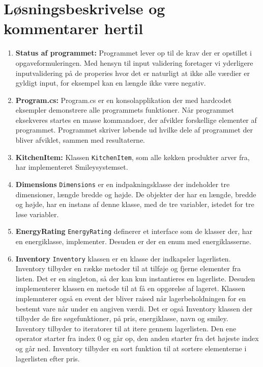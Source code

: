 \documentclass[11pt]{article}
\newcommand{\mono}{\texttt}
\begin{document}
\section{Løsningsbeskrivelse og kommentarer hertil}
\begin{enumerate}
	\item[] \textbf{Status af programmet:}
	Programmet lever op til de krav der er opstillet i opgaveformuleringen. Med hensyn til input validering foretager vi yderligere inputvalidering på de properies hvor det er naturligt at ikke alle værdier er gyldigt input, for eksempel kan en længde ikke være negativ. 
	\item[] \textbf{Program.cs:}
	Program.cs er en konsolapplikation der med hardcodet eksempler demonstrere alle programmets funktioner. Når programmet eksekveres startes en masse kommandoer, der afvikler forskellige elementer af programmet. Programmet skriver løbende ud hvilke dele af programmet der bliver afviklet, sammen med resultaterne. 
			
	\item[] \textbf{KitchenItem:} Klassen \mono{KitchenItem}, som alle køkken produkter arver fra, har implementeret Smileysystemset.
		
	\item[] \textbf{Dimensions} \mono{Dimensions} er en indpakningsklasse der indeholder tre dimensioner, længde bredde og højde. De objekter der har en længde, bredde og højde, har en instans af denne klasse, med de tre variabler, istedet for tre løse variabler.  
	
	\item[] \textbf{EnergyRating} \mono{EnergyRating} definerer et interface som de klasser der, har en energiklasse, implementer. Desuden er der en enum med energiklasserne. 	
	
	\item[] \textbf{Inventory} \mono{Inventory} klassen er en klasse der indkapsler lagerlisten. Inventory tilbyder en række metoder til at tilføje og fjerne elementer fra listen. Det er en singleton, så der kan kun instantieres en lagerliste. Desuden implementerer klassen en metode til at få en opgørelse af lageret. Klassen implemnterer også en event der bliver raised når lagerbeholdningen for en bestemt vare når under en angiven værdi. Det er også Inventory klassen der tilbyder de fire søgefunktioner, på pris, energiklasse, navn og smiley. Inventory tilbyder to iteratorer til at itere gennem lagerlisten. Den ene operator starter fra index 0 og går op, den anden starter fra det højeste index og går ned. Inventory tilbyder en sort funktion til at sortere elementerne i lagerlisten efter pris.
	

\end{enumerate}
\end{document}
